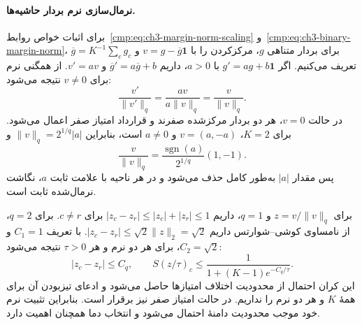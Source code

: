 \paragraph{نرمال‌سازی نرم بردار حاشیه‌ها.}
برای اثبات خواص روابط~\eqref{cmp:eq:ch3-margin-norm-scaling} و~\eqref{cmp:eq:ch3-binary-margin-norm}، برای بردار متناهی $g$، مرکزکردن را با
$v=g-\overline g\mathbf1$ و
$\overline g=K^{-1}\sum_cg_c$ تعریف می‌کنیم.
اگر $g'=ag+b\mathbf1$ با $a>0$، داریم
$\overline g'=a\overline g+b$ و $v'=av$.
از همگنی نرم برای $v\ne0$ نتیجه می‌شود:
\begin{equation}\label{eq:app-ch3-margin-norm-invariance}
\frac{v'}{\|v'\|_q}=\frac{av}{a\|v\|_q}
=\frac{v}{\|v\|_q}.
\end{equation}
در حالت $v=0$، هر دو بردار مرکز‌شده صفرند و
قرارداد امتیاز صفر اعمال می‌شود. برای $K=2$،
$v=(a,-a)$ و $a\ne0$ است، بنابراین
$\|v\|_q=2^{1/q}|a|$ و
\begin{equation}\label{eq:app-ch3-binary-margin-norm}
\frac{v}{\|v\|_q}=
\frac{\operatorname{sgn}(a)}{2^{1/q}}(1,-1).
\end{equation}
پس مقدار $|a|$ به‌طور کامل حذف می‌شود و در هر ناحیه
با علامت ثابت $a$، نگاشت نرمال‌شده ثابت است.

برای $z=v/\|v\|_q$ و $q=1$، داریم
$|z_c-z_r|\le |z_c|+|z_r|\le1$ برای $c\ne r$.
برای $q=2$، از نامساوی کوشی--شوارتس داریم
$|z_c-z_r|\le\sqrt2\|z\|_2=\sqrt2$.
با تعریف $C_1=1$ و $C_2=\sqrt2$، برای هر دو نرم
و هر $\tau>0$ نتیجه می‌شود:
\begin{equation}\label{eq:app-ch3-margin-norm-bound}
|z_c-z_r|\le C_q,\qquad
S(z/\tau)_c\le\frac{1}{1+(K-1)e^{-C_q/\tau}}.
\end{equation}
این کران احتمال از محدودیت اختلاف امتیازها حاصل
می‌شود و ادعای تیزبودن آن برای همهٔ $K$ و هر دو
نرم را نداریم. در حالت امتیاز صفر نیز برقرار است.
بنابراین تثبیت نرم خود موجب محدودیت دامنهٔ احتمال
می‌شود و انتخاب دما همچنان اهمیت دارد.

